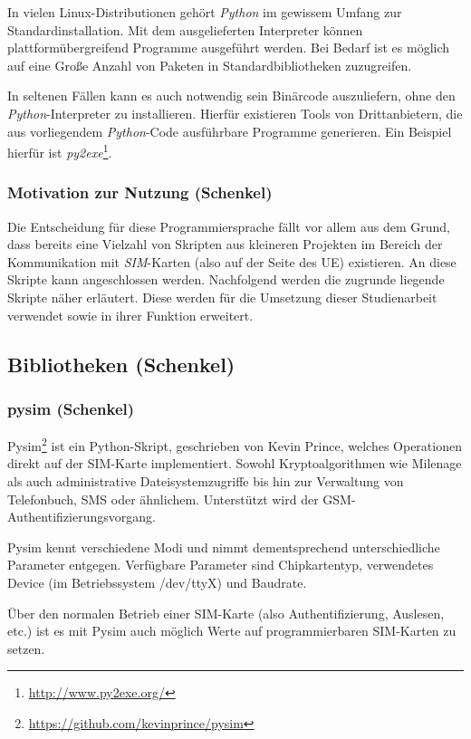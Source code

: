 In vielen Linux-Distributionen gehört \textit{Python} im gewissem Umfang zur Standardinstallation.
Mit dem ausgelieferten Interpreter können plattformübergreifend Programme ausgeführt werden. Bei
Bedarf ist es möglich auf eine Große Anzahl von Paketen in Standardbibliotheken zuzugreifen.

In seltenen Fällen kann es auch notwendig sein Binärcode auszuliefern, ohne den
\textit{Python}-Interpreter zu installieren. Hierfür existieren Tools von Drittanbietern,
die aus vorliegendem \textit{Python}-Code ausführbare Programme generieren. Ein Beispiel hierfür
ist \textit{py2exe}\footnote{\url{http://www.py2exe.org/}}.

\subsubsection{Motivation zur Nutzung (Schenkel)}
Die Entscheidung für diese Programmiersprache fällt vor allem aus dem Grund, dass bereits eine
Vielzahl von Skripten aus kleineren Projekten im Bereich der Kommunikation mit \textit{SIM}-Karten
(also auf der Seite des UE) existieren. An diese Skripte kann angeschlossen werden. Nachfolgend werden die zugrunde liegende
Skripte näher erläutert. Diese werden für die Umsetzung dieser Studienarbeit verwendet sowie
in ihrer Funktion erweitert.

\subsection{Bibliotheken (Schenkel)}
\subsubsection{pysim (Schenkel)}
\label{subsec:pysim}
Pysim\footnote{\url{https://github.com/kevinprince/pysim}} ist ein
Python-Skript, geschrieben von Kevin Prince,
welches Operationen direkt auf der SIM-Karte implementiert.
Sowohl Kryptoalgorithmen wie Milenage als auch administrative Dateisystemzugriffe
bis hin zur Verwaltung von Telefonbuch, SMS oder ähnlichem.
Unterstützt wird der GSM-Authentifizierungsvorgang.

Pysim kennt verschiedene Modi und nimmt dementsprechend unterschiedliche
Parameter entgegen. Verfügbare Parameter sind Chipkartentyp, verwendetes
Device (im Betriebssystem /dev/ttyX) und Baudrate\cite{pysimprince}.

Über den normalen Betrieb einer SIM-Karte (also Authentifizierung, Auslesen, etc.)
ist es mit Pysim auch möglich Werte auf programmierbaren SIM-Karten zu setzen.


